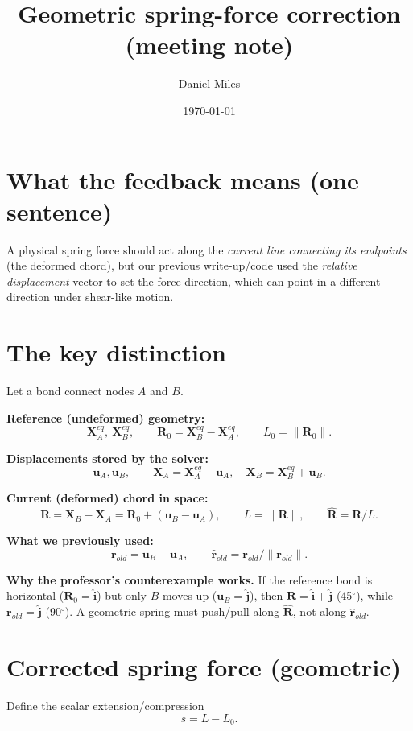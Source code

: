 \documentclass[11pt,a4paper]{article}
\title{\textbf{Geometric spring-force correction (meeting note)}}
\author{Daniel Miles}
\date{\today}
\begin{document}
\maketitle

\section{What the feedback means (one sentence)}
A physical spring force should act along the \emph{current line connecting its endpoints} (the deformed chord), but our previous write-up/code used the \emph{relative displacement} vector to set the force direction, which can point in a different direction under shear-like motion.

\section{The key distinction}
Let a bond connect nodes $A$ and $B$.

\textbf{Reference (undeformed) geometry:}
\[
\mathbf{X}_A^{eq},\ \mathbf{X}_B^{eq},\qquad \mathbf{R}_0 = \mathbf{X}_B^{eq}-\mathbf{X}_A^{eq},\qquad L_0 = \|\mathbf{R}_0\|.
\]

\textbf{Displacements stored by the solver:}
\[
\mathbf{u}_A,\mathbf{u}_B,\qquad \mathbf{X}_A=\mathbf{X}_A^{eq}+\mathbf{u}_A,\quad \mathbf{X}_B=\mathbf{X}_B^{eq}+\mathbf{u}_B.
\]

\textbf{Current (deformed) chord in space:}
\begin{equation}
\mathbf{R}=\mathbf{X}_B-\mathbf{X}_A=\mathbf{R}_0 + (\mathbf{u}_B-\mathbf{u}_A),\qquad L=\|\mathbf{R}\|,\qquad \hat{\mathbf{R}}=\mathbf{R}/L.
\label{eq:Rdef}
\end{equation}

\textbf{What we previously used:}
\[
\mathbf{r}_{old}=\mathbf{u}_B-\mathbf{u}_A,\qquad \hat{\mathbf{r}}_{old}=\mathbf{r}_{old}/\|\mathbf{r}_{old}\|.
\]

\begin{takeaway}
\textbf{Why the professor's counterexample works.} If the reference bond is horizontal ($\mathbf{R}_0=\hat{\mathbf{i}}$) but only $B$ moves up ($\mathbf{u}_B=\hat{\mathbf{j}}$), then $\mathbf{R}=\hat{\mathbf{i}}+\hat{\mathbf{j}}$ (45$^\circ$), while $\mathbf{r}_{old}=\hat{\mathbf{j}}$ (90$^\circ$). A geometric spring must push/pull along $\hat{\mathbf{R}}$, not along $\hat{\mathbf{r}}_{old}$.
\end{takeaway}

\section{Corrected spring force (geometric)}
Define the scalar extension/compression
\begin{equation}
s = L - L_0.
\label{eq:sdef}
\end{equation}
\end{document}
